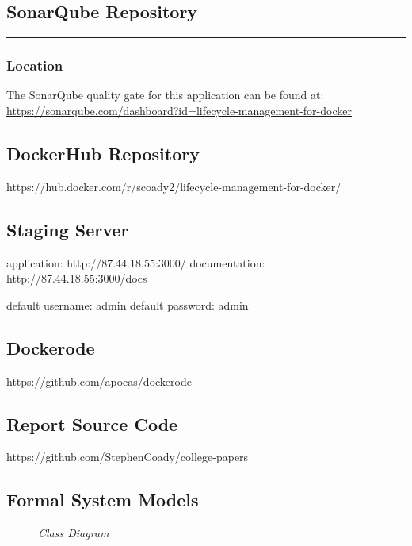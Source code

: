 \subsection{SonarQube Repository} 
\label{appendix:sonarqube}
\rule{\textwidth}{0.4pt}
\subsubsection{Location}
The SonarQube quality gate for this application can be found at:
\url{https://sonarqube.com/dashboard?id=lifecycle-management-for-docker}



\subsection{DockerHub Repository} 
\label{appendix:dockerhub}
https://hub.docker.com/r/scoady2/lifecycle-management-for-docker/

\subsection{Staging Server} 
\label{appendix:staging}
application: http://87.44.18.55:3000/ \newline
documentation: http://87.44.18.55:3000/docs

default username: admin \newline
default password: admin

\subsection{Dockerode} 
\label{appendix:dockerode_appendix}
https://github.com/apocas/dockerode

\subsection{Report Source Code} 
\label{appendix:reports}
https://github.com/StephenCoady/college-papers

\clearpage
\subsection{Formal System Models}
\label{appendix:models}

\begin{figure}[!ht]
\centering
{}
\caption{\em Class Diagram}
\end{figure}

